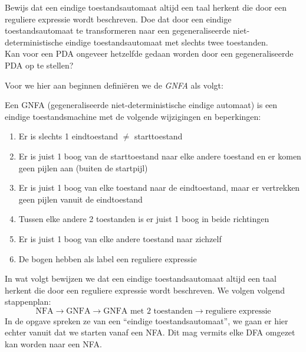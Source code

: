 \begin{question}
Bewijs dat een eindige toestandsautomaat altijd een taal herkent die door een reguliere expressie wordt beschreven. Doe dat door een eindige toestandsautomaat te transformeren naar een gegeneraliseerde niet-deterministische eindige toestandsautomaat met slechts twee toestanden.\\
Kan voor een PDA ongeveer hetzelfde gedaan worden door een gegeneraliseerde PDA op te stellen?\\
\end{question}

Voor we hier aan beginnen defini\"eren we de \emph{GNFA} als volgt:
\begin{theorem}[GNFA]
Een GNFA (gegeneraliseerde niet-deterministische eindige automaat) is een eindige toestandsmachine met de volgende wijzigingen en beperkingen:
\begin{enumerate}
\item Er is slechts 1 eindtoestand $\neq$ starttoestand
\item Er is juist 1 boog van de starttoestand naar elke andere toestand en er komen geen pijlen aan (buiten de startpijl)
\item Er is juist 1 boog van elke toestand naar de eindtoestand, maar er vertrekken geen pijlen vanuit de eindtoestand
\item Tussen elke andere 2 toestanden is er juist 1 boog in beide richtingen
\item Er is juist 1 boog van elke andere toestand naar zichzelf
\item De bogen hebben als label een reguliere expressie
\end{enumerate}
\end{theorem}
In wat volgt bewijzen we dat een eindige toestandsautomaat altijd een taal herkent die door een reguliere expressie wordt beschreven. We volgen volgend stappenplan:
$$ \text{NFA} \rightarrow \text{GNFA} \rightarrow \text{GNFA met 2 toestanden} \rightarrow \text{reguliere expressie} $$
In de opgave spreken ze van een ``eindige toestandsautomaat'', we gaan er hier echter vanuit dat we starten vanaf een NFA. Dit mag vermits elke DFA omgezet kan worden naar een NFA.

